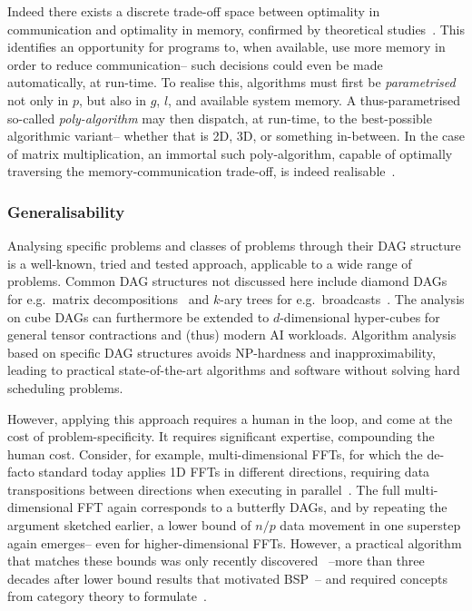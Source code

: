 \documentclass[oneside,reqno, a4paper]{amsart}
\numberwithin{equation}{section}
\begin{document}
Indeed there exists a discrete trade-off space between optimality in communication and optimality in memory,
confirmed by theoretical studies~\cite{irony04}.
This
identifies an opportunity for programs to, when available,
use more memory in order to reduce communication--
such decisions could even be made automatically,
at run-time.
To realise this, algorithms must first be \emph{parametrised} not only in $p$, but also in $g$, $l$, and available system memory.
A thus-parametrised so-called \emph{poly-algorithm} may then dispatch,
at run-time,
to the best-possible algorithmic variant-- whether that is 2D, 3D, or something in-between.
In the case of matrix multiplication,
an immortal such poly-algorithm,
capable of optimally traversing the memory-communication trade-off,
is indeed realisable~\cite{mccoll99}.

\subsubsection*{Generalisability}

Analysing specific problems and classes of problems through their DAG structure is a well-known,
tried and tested approach,
applicable to a wide range of problems.
Common DAG structures not discussed here include diamond DAGs for e.g.\ matrix decompositions~\cite{tiskin02,petitet16,sao18,ballard18} and $k$-ary trees for e.g.\ broadcasts~\cite{papadimitriou88,gerbessiotis94}.
The analysis on cube DAGs can furthermore be extended to $d$-dimensional hyper-cubes for general tensor contractions and (thus) modern AI workloads.
Algorithm analysis based on specific DAG structures avoids NP-hardness and inapproximability,
leading to practical state-of-the-art algorithms and software without solving hard scheduling problems.

However,
applying this approach requires a human in the loop,
and come at the cost of problem-specificity.
It requires significant expertise, compounding the human cost.
Consider, for example, multi-dimensional FFTs,
for which the de-facto standard today applies 1D FFTs in different directions,
requiring data transpositions between directions when executing in parallel~\cite{popovici20}.
The full multi-dimensional FFT again corresponds to a butterfly DAGs, %
and by repeating the argument sketched earlier,
a lower bound of $n/p$ data movement in one superstep again emerges-- even for higher-dimensional FFTs.
However, a practical algorithm that matches these bounds was only recently discovered~\cite{koopman23}
--more than three decades after lower bound results that motivated BSP~\cite{valiant90}--
and required concepts from category theory to formulate~\cite{koopman25}.
\end{document}
